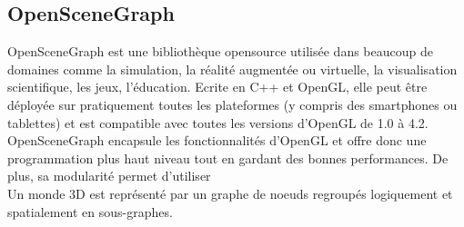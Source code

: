 \subsection{OpenSceneGraph}

OpenSceneGraph est une bibliothèque opensource utilisée dans beaucoup de domaines comme la simulation, la réalité augmentée ou virtuelle, la visualisation scientifique, les jeux, l'éducation. Ecrite en C++ et OpenGL, elle peut être déployée sur pratiquement toutes les plateformes (y compris des smartphones ou tablettes) et est compatible avec toutes les versions d'OpenGL de 1.0 à 4.2. \\
OpenSceneGraph encapsule les fonctionnalités d'OpenGL et offre donc une programmation plus haut niveau tout en gardant des bonnes performances. De plus, sa modularité permet d'utiliser  \\
Un monde 3D est représenté par un graphe de noeuds regroupés logiquement et spatialement en sous-graphes.  